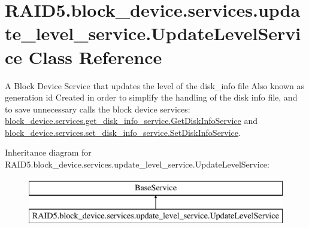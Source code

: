 \hypertarget{class_r_a_i_d5_1_1block__device_1_1services_1_1update__level__service_1_1_update_level_service}{}\section{R\+A\+I\+D5.\+block\+\_\+device.\+services.\+update\+\_\+level\+\_\+service.\+Update\+Level\+Service Class Reference}
\label{class_r_a_i_d5_1_1block__device_1_1services_1_1update__level__service_1_1_update_level_service}


A Block Device Service that updates the level of the disk\+\_\+info file Also known as generation id Created in order to simplify the handling of the disk info file, and to save unnecessary calls the block device services\+: \hyperlink{class_r_a_i_d5_1_1block__device_1_1services_1_1get__disk__info__service_1_1_get_disk_info_service}{block\+\_\+device.\+services.\+get\+\_\+disk\+\_\+info\+\_\+service.\+Get\+Disk\+Info\+Service} and \hyperlink{class_r_a_i_d5_1_1block__device_1_1services_1_1set__disk__info__service_1_1_set_disk_info_service}{block\+\_\+device.\+services.\+set\+\_\+disk\+\_\+info\+\_\+service.\+Set\+Disk\+Info\+Service}.  


Inheritance diagram for R\+A\+I\+D5.\+block\+\_\+device.\+services.\+update\+\_\+level\+\_\+service.\+Update\+Level\+Service\+:\begin{figure}[H]
\begin{center}
\leavevmode
\includegraphics[height=2.000000cm]{class_r_a_i_d5_1_1block__device_1_1services_1_1update__level__service_1_1_update_level_service}
\end{center}
\end{figure}
